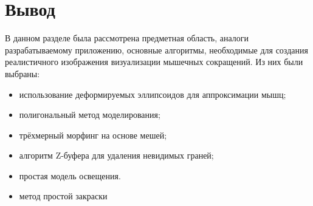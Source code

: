 \section{Вывод}
\label{sec:conc_analysis}
В данном разделе была рассмотрена предметная область, аналоги разрабатываемому приложению, основные алгоритмы, необходимые для создания реалистичного изображения визуализации мышечных сокращений. Из них были выбраны:
\begin{itemize}
	\item использование деформируемых эллипсоидов для аппроксимации мышц;
	\item полигональный метод моделирования;
	\item трёхмерный морфинг на основе мешей;
	\item алгоритм Z-буфера для удаления невидимых граней;
	\item простая модель освещения.
	\item метод простой закраски
\end{itemize}